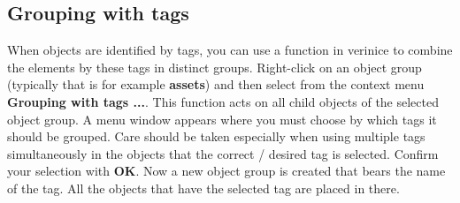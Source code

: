 \documentclass[a4paper,10pt]{book}
\begin{document}
\subsection{Grouping with tags}
\label{sec:grouping-with-tags}

When objects are identified by tags, you can use a function in verinice to combine the elements by these tags in distinct groups.
Right-click on an object group (typically that is for example  \textbf{assets}) and then select from the context menu \textbf{Grouping with tags ...}.
This function acts on all child objects of the selected object group.
A menu window appears where you must choose by which tags it should be grouped.
Care should be taken especially when using multiple tags simultaneously in the objects that the correct / desired tag is selected. Confirm your selection with \textbf{OK}.
Now a new object group is created that bears the name of the tag.
All the objects that have the selected tag are placed in there.
\end{document}

